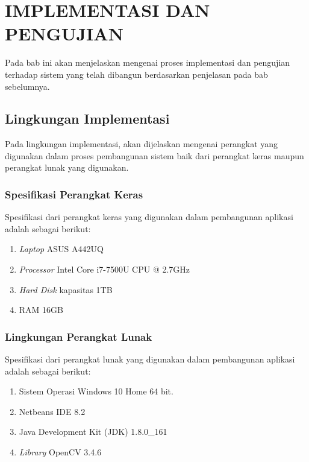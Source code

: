 \chapter{IMPLEMENTASI DAN PENGUJIAN}

%
\vspace{4.5pt}
\noindent Pada bab ini akan menjelaskan mengenai proses implementasi dan pengujian terhadap sistem yang telah dibangun berdasarkan penjelasan pada bab sebelumnya.\\

\section{Lingkungan Implementasi}
\noindent Pada lingkungan implementasi, akan dijelaskan mengenai perangkat yang digunakan dalam proses pembangunan sistem baik dari perangkat keras maupun perangkat lunak yang digunakan.\\

\subsection{Spesifikasi Perangkat Keras}
\noindent Spesifikasi dari perangkat keras yang digunakan dalam pembangunan aplikasi adalah sebagai berikut:
\begin{enumerate}[noitemsep]
\item \textit{Laptop} ASUS A442UQ
\item \textit{Processor} Intel Core i7-7500U CPU @ 2.7GHz
\item \textit{Hard Disk} kapasitas 1TB
\item RAM 16GB\\
\end{enumerate}

\subsection{Lingkungan Perangkat Lunak}
\noindent Spesifikasi dari perangkat lunak yang digunakan dalam pembangunan aplikasi adalah sebagai berikut:
\begin{enumerate}[noitemsep]
\item Sistem Operasi Windows 10 Home 64 bit.
\item Netbeans IDE 8.2
\item Java Development Kit (JDK) 1.8.0{\_}161
\item \textit{Library} OpenCV 3.4.6\\
\end{enumerate}

